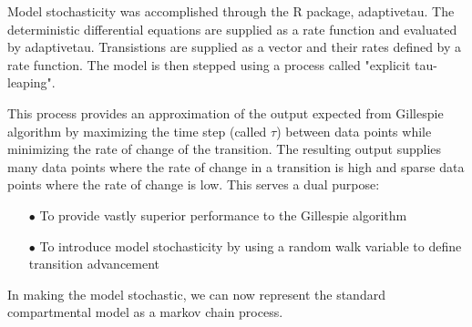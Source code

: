 \documentclass[../Paper.tex]{subfiles}
\begin{document}
\raggedright
Model stochasticity was accomplished through the R package, adaptivetau\cite{johnson_2016}.
The deterministic differential equations are supplied as a rate function and evaluated
by adaptivetau. Transistions are supplied as a vector and their rates defined by
a rate function. The model is then stepped using a process called 
"explicit tau-leaping"\cite{yang_gillespie_petzold_2007}.

This process provides an approximation of the output expected from Gillespie algorithm by maximizing
the time step (called $\tau$) between data points while minimizing the rate of change
of the transition. The resulting output supplies many data points where the rate of
change in a transition is high and sparse data points where the rate
of change is low. This serves a dual purpose:

\begin{enumerate}
  \item[$\bullet$]{To provide vastly superior performance to the Gillespie algorithm}
  \item[$\bullet$]{To introduce model stochasticity by using a random walk variable
                   to define transition advancement}
\end{enumerate}
 
In making the model stochastic, we can now represent the standard compartmental model
as a markov chain process. 
\end{document}
